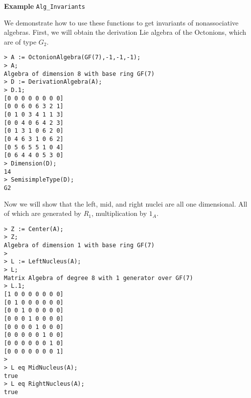 \begin{framed}{\bf Example} {\tt Alg\_Invariants}\\
{\small 
We demonstrate how to use these functions to get invariants of nonassociative algebras.
First, we will obtain the derivation Lie algebra of the Octonions, which are of type $G_2$.
\begin{lstlisting}[frame=single,basicstyle=\ttfamily\color{black!30!
teal},backgroundcolor=\color{white!70!gray}]
> A := OctonionAlgebra(GF(7),-1,-1,-1);
> A;
Algebra of dimension 8 with base ring GF(7)
> D := DerivationAlgebra(A);
> D.1;
[0 0 0 0 0 0 0 0]
[0 0 6 0 6 3 2 1]
[0 1 0 3 4 1 1 3]
[0 0 4 0 6 4 2 3]
[0 1 3 1 0 6 2 0]
[0 4 6 3 1 0 6 2]
[0 5 6 5 5 1 0 4]
[0 6 4 4 0 5 3 0]
> Dimension(D);
14
> SemisimpleType(D);
G2
\end{lstlisting}
Now we will show that the left, mid, and right nuclei are all one dimensional. 
All of which are generated by $R_1$, multiplication by $1_A$.
\begin{lstlisting}[frame=single,basicstyle=\ttfamily\color{black!30!
teal},backgroundcolor=\color{white!70!gray}]
> Z := Center(A);
> Z;
Algebra of dimension 1 with base ring GF(7)
> 
> L := LeftNucleus(A);
> L;
Matrix Algebra of degree 8 with 1 generator over GF(7)
> L.1;
[1 0 0 0 0 0 0 0]
[0 1 0 0 0 0 0 0]
[0 0 1 0 0 0 0 0]
[0 0 0 1 0 0 0 0]
[0 0 0 0 1 0 0 0]
[0 0 0 0 0 1 0 0]
[0 0 0 0 0 0 1 0]
[0 0 0 0 0 0 0 1]
> 
> L eq MidNucleus(A);
true
> L eq RightNucleus(A);
true
\end{lstlisting}
}
\end{framed}
